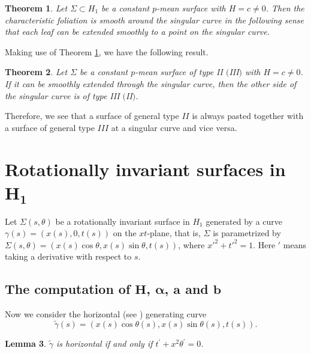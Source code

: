 \documentclass[10pt,a4paper]{amsart}
\numberwithin{equation}{section}
\newtheorem{Theorem}{Theorem}[section]
\newtheorem{Lemma}[Theorem]{Lemma}
\begin{document}
\begin{Theorem}\label{theo2}
Let $\Sigma\subset H_{1}$ be a constant $p$-mean surface with $H=c\neq 0$. Then the characteristic foliation is smooth around the singular curve in the following sense that each leaf can be extended smoothly to a point on the singular curve.
\end{Theorem}

Making use of Theorem \ref{theo2}, we have the following result.
\begin{Theorem}\label{main10}
Let $\Sigma$ be a constant $p$-mean surface of type II $($III$)$ with $H=c\neq 0$. If it can be smoothly extended through the singular curve, then the other side of the singular curve is of type III $($II$)$.
\end{Theorem}

Therefore, we see that a surface of general type $II$ is always pasted together with a surface of general type $III$ at a singular curve and vice versa.



\section[Rotationally invariant surfaces in H\_1]{Rotationally invariant surfaces in $\boldsymbol{ H_1}$}

Let $\Sigma(s,\theta)$ be a rotationally invariant surface in $H_1$
generated by a curve $\gamma(s)=(x(s),0,t(s))$ on the $xt$-plane,
that is, $\Sigma$ is parametrized by
$
\Sigma(s,\theta)=(x(s)\cos \theta,x(s)\sin \theta,t(s))$,
where ${x'^{2}+t'^{2}=1}$. Here $'$ means taking a derivative with respect to $s$.

\subsection[The computation of H, alpha, a and b]{The computation of $\boldsymbol{H}$, $\boldsymbol{\alpha}$, $\boldsymbol{a}$ and $\boldsymbol{b}$}

Now we consider the horizontal (see \cite[Definition 1.1]{ChiuH/HuangY/LaiS:2017}) generating curve
\[
\tilde{\gamma}(s)=(x(s)\cos \theta(s),x(s)\sin \theta(s),t(s)).
\]

\begin{Lemma}
$\tilde{\gamma}$ is horizontal if and only if $t^{\prime}+x^{2}\theta^{\prime}=0$.
\end{Lemma}
\end{document}
